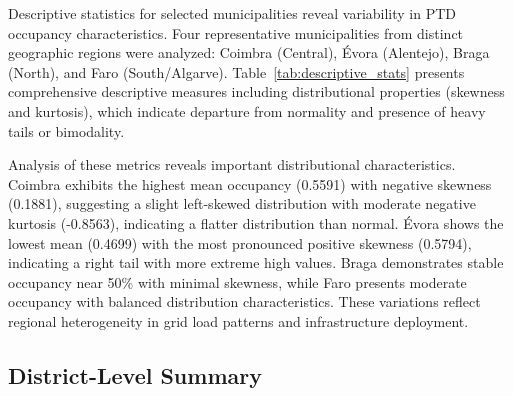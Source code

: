 \documentclass[conference]{IEEEtran}
\begin{document}
Descriptive statistics for selected municipalities reveal variability in PTD occupancy characteristics. Four representative municipalities from distinct geographic regions were analyzed: Coimbra (Central), Évora (Alentejo), Braga (North), and Faro (South/Algarve). Table~\ref{tab:descriptive_stats} presents comprehensive descriptive measures including distributional properties (skewness and kurtosis), which indicate departure from normality and presence of heavy tails or bimodality.

\begin{table}[htbp]
\centering
\caption{Descriptive Statistics of PTD Utilization Levels (4 Decimal Places)}
\small
{}
\label{tab:descriptive_stats}
\end{table}

Analysis of these metrics reveals important distributional characteristics. Coimbra exhibits the highest mean occupancy (0.5591) with negative skewness (0.1881), suggesting a slight left-skewed distribution with moderate negative kurtosis (-0.8563), indicating a flatter distribution than normal. Évora shows the lowest mean (0.4699) with the most pronounced positive skewness (0.5794), indicating a right tail with more extreme high values. Braga demonstrates stable occupancy near 50\% with minimal skewness, while Faro presents moderate occupancy with balanced distribution characteristics. These variations reflect regional heterogeneity in grid load patterns and infrastructure deployment.

\subsection{District-Level Summary}
\end{document}

